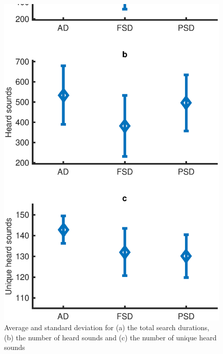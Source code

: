 \documentclass{aes2e}
\begin{document}
\begin{figure}[t]
\begin{center}
\includegraphics[scale=0.4]{gfx/analyse1.eps} 
\end{center}
\caption{\label{fig1} Average and standard deviation for (a) the total search durations, (b) the number of heard sounds and (c) the number of unique heard sounds}
\end{figure}  
\end{document}
